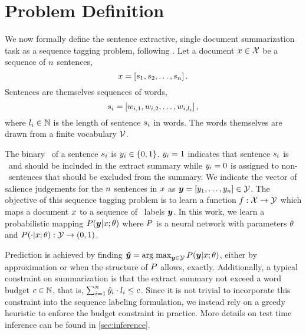 \section{Problem Definition}

We now formally define the sentence extractive, single document summarization
task as a sequence tagging problem, following \cite{conroy2001}.  Let a
document $x\in \mathcal{X}$ be a sequence of $n$ sentences, 
\[ 
    x = \left[ s_1, s_2, \ldots, s_n\right].
\] 
Sentences are themselves sequences of words,
\[
    s_i=\left[
        w_{i,1}, w_{i,2}, \ldots, w_{i,{l_i}}\right],
\]
where $l_i\in\mathbb{N}$ is the length of sentence $s_i$ in words.
The words themselves are drawn from a finite vocabulary $\mathcal{V}$.

The binary \salience~of a sentence $s_i$ is $y_i \in\{0,1\}$.
$y_i=1$ indicates that sentence $s_i$ is \salient~and should be
included in the extract summary while $y_i=0$ is assigned to
non-\salient~sentences that should be excluded from the summary.  We indicate
the vector of salience judgements for the $n$ sentences in $x$ as
$\boldsymbol{y} = \left[y_1,\ldots,y_n\right]\in  \mathcal{Y}$.  The
objective of this sequence tagging problem is to learn a function $f :
\mathcal{X} \rightarrow \mathcal{Y}$ which maps a document $x$ to a sequence
of \salience~labels $\boldsymbol{y}$. In this work, we learn a probabilistic mapping
$P(\boldsymbol{y}|x;\theta)$ where $P$ is a neural network with
parameters $\theta$ and $P(\cdot|x;\theta) : \mathcal{Y} \rightarrow
(0,1)$. 

Prediction is achieved by finding $\boldsymbol{\hat{y}} = \operatorname{arg\;max}_{\boldsymbol{y}
\in \mathcal{Y}} P(\boldsymbol{y}|x;\theta)$, either by approximation or when
the structure of $P$ allows, exactly.  Additionally, a typical constraint
on summarization is that the extract summary not exceed a word budget
$c \in \mathbb{N}$, that is, $\sum_{i=1}^n \hat{y}_i \cdot
l_i \le c$.  Since it is not trivial to incorporate this
constraint into the sequence labeling formulation, we instead rely on a greedy
heuristic to enforce the budget constraint in practice. More details on test
time inference can be found in \autoref{sec:inference}.
